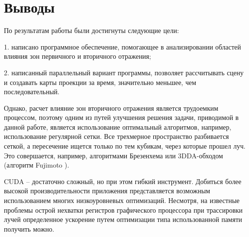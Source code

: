 \newpage
\section*{Выводы} 

По результатам работы были достигнуты следующие цели:

1. написано программное обеспечение, помогающее в анализировании областей влияния зон первичного и вторичного отражения;

2. написанный параллельный вариант программы, позволяет рассчитывать сцену и создавать карты проекции за время, значительно меньшее, чем последовательный. 

Однако, расчет влияние зон вторичного отражения является трудоемким процессом, поэтому одним из путей улучшения решения задачи, приводимой в данной работе, является использование оптимальный алгоритмов, например, использование регулярной сетки. Все трехмерное пространство разбивается сеткой, а пересечение ищется только по тем кубикам, через которые прошел луч. Это совершается, например, алгоритмами Брезенхема \cite{brezenhem} или 3DDA-обходом (алгоритм Fujimoto \cite{3dda}).

CUDA -- достаточно сложный, но при этом гибкий инструмент. Добиться более высокой производительности приложения представляется возможным использованием многих низкоуровневых оптимизаций. Несмотря, на известные проблемы острой нехватки регистров графического процессора при трассировки лучей \cite{boreskov1} определенное ускорение путем оптимизации типа использованной памяти получить можно.

